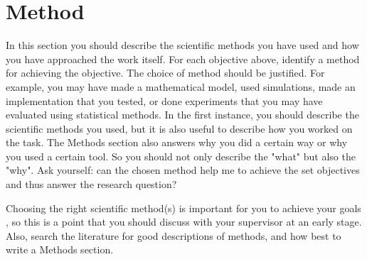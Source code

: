\section{Method} 
\label{sec:method}

In this section you should describe the scientific methods you have used and how you have approached the work itself. For each objective above, identify a method for achieving the objective. The choice of method should be justified. For example, you may have made a mathematical model, used simulations, made an implementation that you tested, or done experiments that you may have evaluated using statistical methods. In the first instance, you should describe the scientific methods you used, but it is also useful to describe how you worked on the task. The Methods section also answers why you did a certain way or why you used a certain tool. So you should not only describe the "what" but also the "why". Ask yourself: can the chosen method help me to achieve the set objectives and thus answer the research question?

Choosing the right scientific method(s) is important for you to achieve your goals \cite{researchmethodology,forskningsmetodik}, so this is a point that you should discuss with your supervisor at an early stage. Also, search the literature for good descriptions of methods, and how best to write a Methods section. 
